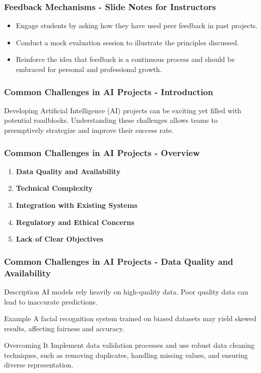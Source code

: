 \documentclass[aspectratio=169]{beamer}
\begin{document}
\begin{frame}[fragile]
    \frametitle{Feedback Mechanisms - Slide Notes for Instructors}
    \begin{itemize}
        \item Engage students by asking how they have used peer feedback in past projects.
        \item Conduct a mock evaluation session to illustrate the principles discussed.
        \item Reinforce the idea that feedback is a continuous process and should be embraced for personal and professional growth.
    \end{itemize}
\end{frame}

\begin{frame}[fragile]
    \frametitle{Common Challenges in AI Projects - Introduction}
    Developing Artificial Intelligence (AI) projects can be exciting yet filled with potential roadblocks. Understanding these challenges allows teams to preemptively strategize and improve their success rate.
\end{frame}

\begin{frame}[fragile]
    \frametitle{Common Challenges in AI Projects - Overview}
    \begin{enumerate}
        \item \textbf{Data Quality and Availability}
        \item \textbf{Technical Complexity}
        \item \textbf{Integration with Existing Systems}
        \item \textbf{Regulatory and Ethical Concerns}
        \item \textbf{Lack of Clear Objectives}
    \end{enumerate}
\end{frame}

\begin{frame}[fragile]
    \frametitle{Common Challenges in AI Projects - Data Quality and Availability}
    \begin{block}{Description}
        AI models rely heavily on high-quality data. Poor quality data can lead to inaccurate predictions.
    \end{block}
    \begin{block}{Example}
        A facial recognition system trained on biased datasets may yield skewed results, affecting fairness and accuracy.
    \end{block}
    \begin{block}{Overcoming It}
        Implement data validation processes and use robust data cleaning techniques, such as removing duplicates, handling missing values, and ensuring diverse representation.
    \end{block}
\end{frame}
\end{document}
